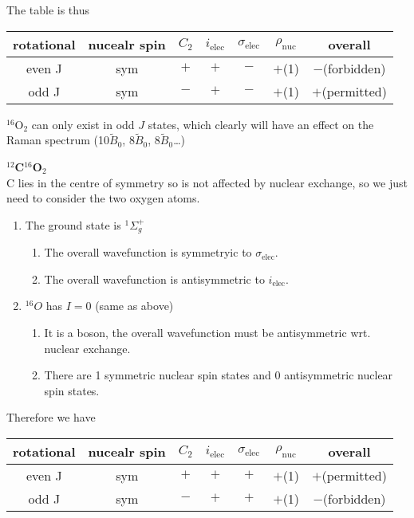 The table is thus
\begin{center}
\begin{tabular}{cc|cccc|c}
\hline
rotational & nucealr spin & $C_2$ & $i_{\text{elec}}$ & $\sigma_{\text{elec}}$ & $\rho_{\text{nuc}}$ & overall\\
\hline
even J & sym & $+$ & $+$ & $-$ & $+$(1) & $-$(forbidden)\\
odd J & sym & $-$ & $+$ & $-$ & $+$(1) & $+$(permitted)\\
\hline
\end{tabular}
\end{center}
$^{16}$O$_2$ can only exist in odd $J$ states, which clearly will have an effect on the Raman spectrum (10$\widetilde{B}_0$, 8$\widetilde{B}_0$, 8$\widetilde{B}_0$\dots)\par
\textbf{$^{12}$C$^{16}$O$_2$}\\
C lies in the centre of symmetry so is not affected by nuclear exchange, so we just need to consider the two oxygen atoms.
\begin{enumerate}
  \item The ground state is $^1\Sigma_g^+$
  \begin{enumerate}
  \item The overall wavefunction is symmetryic to $\sigma_{\text{elec}}$.
  \item The overall wavefunction is antisymmetric to $i_{\text{elec}}$.
\end{enumerate}
\item $^{16}O$ has $I=0$ (same as above)
\begin{enumerate}
  \item It is a boson, the overall wavefunction must be antisymmetric wrt. nuclear exchange.
  \item There are 1 symmetric nuclear spin states and 0 antisymmetric nuclear spin states.
\end{enumerate}
\end{enumerate}
Therefore we have
\begin{center}
\begin{tabular}{cc|cccc|c}
\hline
rotational & nucealr spin & $C_2$ & $i_{\text{elec}}$ & $\sigma_{\text{elec}}$ & $\rho_{\text{nuc}}$ & overall\\
\hline
even J & sym & $+$ & $+$ & $+$ & $+$(1) & $+$(permitted)\\
odd J & sym & $-$ & $+$ & $+$ & $+$(1) & $-$(forbidden)\\
\hline
\end{tabular}
\end{center}
